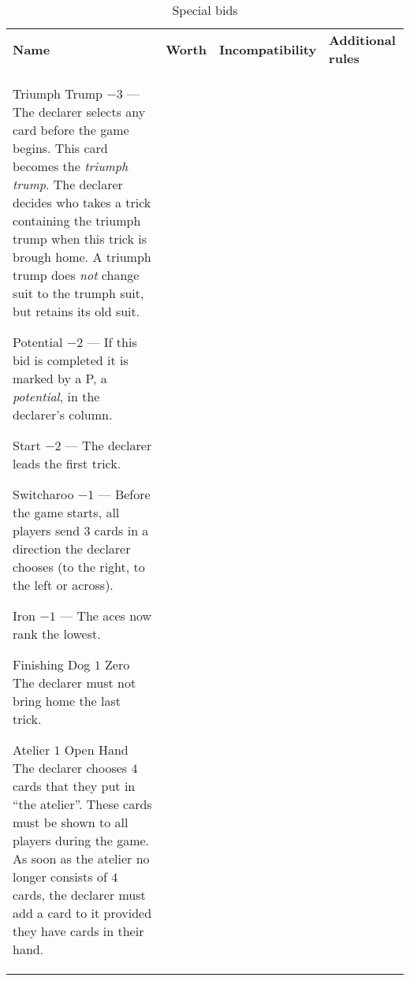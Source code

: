 %
%
%

\newcommand{\nonTrump}{\textnormal{non-trump bids}}

\begin{table}
	\caption{Special bids}\label{tab:specialBids}
	\begin{center}
		\begin{tabularx}{\textwidth}{lcp{3cm}|X}
			\textbf{Name} &
			\textbf{Worth} &
			\textbf{Incompatibility} &
			\textbf{Additional rules}
			\\[-3ex]

			\specialBidItem%
			{Triumph Trump}
			{$-3$}
			{---}
			{%
				The declarer selects any card before the game begins. This card becomes the \emph{triumph trump}. The declarer decides who takes a trick containing the triumph trump when this trick is brough home. A triumph trump does \emph{not} change suit to the trumph suit, but retains its old suit.
			}

			\specialBidItem%
			{Potential}
			{$-2$}
			{---}
			{%
				If this bid is completed it is marked by a P, a \emph{potential}, in the declarer's column.
			}

			\specialBidItem%
			{Start}
			{$-2$}
			{---}
			{%
				The declarer leads the first trick.
			}

			\specialBidItem%
			{Switcharoo}
			{$-1$}
			{---}
			{%
				Before the game starts, all players send $3$ cards in a direction the declarer chooses (to the right, to the left or across).
			}

			\specialBidItem%
			{Iron}
			{$-1$}
			{---}
			{%
				The aces now rank the lowest.
			}

			\specialBidItem%
			{Finishing Dog}
			{$1$}
			{Zero}
			{%
				The declarer must not bring home the last trick. 
			}

			\specialBidItem%
			{Atelier}
			{$1$}
			{Open Hand}
			{%
				The declarer chooses $4$ cards that they put in ``the atelier''. These cards must be shown to all players during the game. As soon as the atelier no longer consists of $4$ cards, the declarer must add a card to it provided they have cards in their hand.
			}


\end{tabularx}
\end{center}
\end{table}
